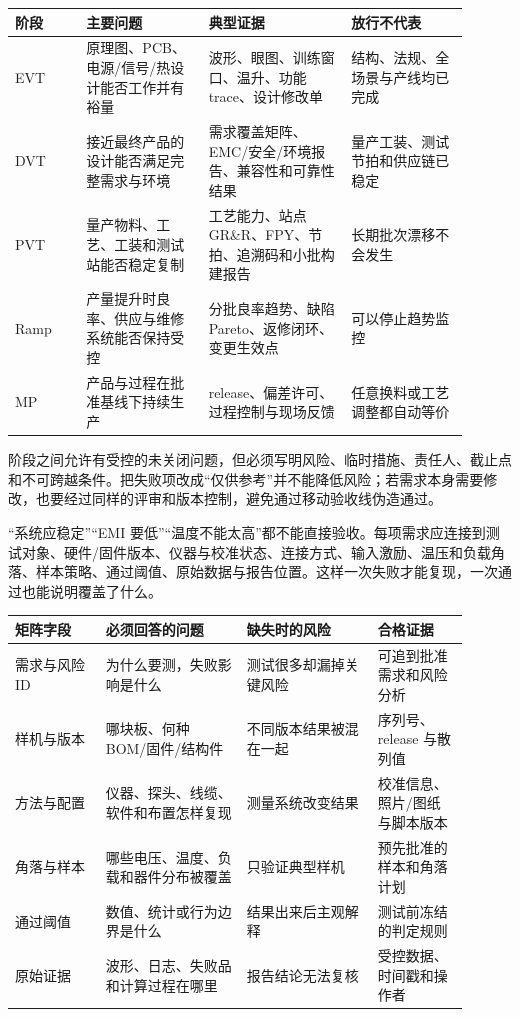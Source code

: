 \begin{longtable}{L{0.14\linewidth}L{0.24\linewidth}L{0.29\linewidth}L{0.23\linewidth}}
\toprule
阶段 & 主要问题 & 典型证据 & 放行不代表 \\
\midrule
EVT & 原理图、PCB、电源/信号/热设计能否工作并有裕量 & 波形、眼图、训练窗口、温升、功能 trace、设计修改单 & 结构、法规、全场景与产线均已完成 \\\tablerowrule
DVT & 接近最终产品的设计能否满足完整需求与环境 & 需求覆盖矩阵、EMC/安全/环境报告、兼容性和可靠性结果 & 量产工装、测试节拍和供应链已稳定 \\\tablerowrule
PVT & 量产物料、工艺、工装和测试站能否稳定复制 & 工艺能力、站点 GR\&R、FPY、节拍、追溯码和小批构建报告 & 长期批次漂移不会发生 \\\tablerowrule
Ramp & 产量提升时良率、供应与维修系统能否保持受控 & 分批良率趋势、缺陷 Pareto、返修闭环、变更生效点 & 可以停止趋势监控 \\\tablerowrule
MP & 产品与过程在批准基线下持续生产 & release、偏差许可、过程控制与现场反馈 & 任意换料或工艺调整都自动等价 \\
\bottomrule
\end{longtable}

阶段之间允许有受控的未关闭问题，但必须写明风险、临时措施、责任人、截止点和不可跨越条件。把失败项改成“仅供参考”并不能降低风险；若需求本身需要修改，也要经过同样的评审和版本控制，避免通过移动验收线伪造通过。


“系统应稳定”“EMI 要低”“温度不能太高”都不能直接验收。每项需求应连接到测试对象、硬件/固件版本、仪器与校准状态、连接方式、输入激励、温压和负载角落、样本策略、通过阈值、原始数据与报告位置。这样一次失败才能复现，一次通过也能说明覆盖了什么。

\begin{longtable}{L{0.18\linewidth}L{0.28\linewidth}L{0.26\linewidth}L{0.18\linewidth}}
\toprule
矩阵字段 & 必须回答的问题 & 缺失时的风险 & 合格证据 \\
\midrule
需求与风险 ID & 为什么要测，失败影响是什么 & 测试很多却漏掉关键风险 & 可追到批准需求和风险分析 \\\tablerowrule
样机与版本 & 哪块板、何种 BOM/固件/结构件 & 不同版本结果被混在一起 & 序列号、release 与散列值 \\\tablerowrule
方法与配置 & 仪器、探头、线缆、软件和布置怎样复现 & 测量系统改变结果 & 校准信息、照片/图纸与脚本版本 \\\tablerowrule
角落与样本 & 哪些电压、温度、负载和器件分布被覆盖 & 只验证典型样机 & 预先批准的样本和角落计划 \\\tablerowrule
通过阈值 & 数值、统计或行为边界是什么 & 结果出来后主观解释 & 测试前冻结的判定规则 \\\tablerowrule
原始证据 & 波形、日志、失败品和计算过程在哪里 & 报告结论无法复核 & 受控数据、时间戳和操作者 \\
\bottomrule
\end{longtable}

